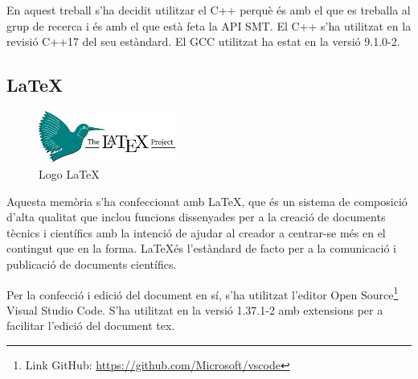 \documentclass[11pt,a4paper,twoside]{report}
\begin{document}
  En aquest treball s'ha decidit utilitzar el C++ perquè és amb el que es treballa al grup de recerca i és amb el que està feta la API SMT. El C++ s'ha utilitzat en la revisió C++17 del seu estàndard. El GCC utilitzat ha estat en la versió 9.1.0-2. 





  \subsection{\LaTeX}
  \begin{figure}[ht!]
    \centering
    \includegraphics[width=0.4\textwidth]{Diagrames/latex.png}
    \caption{Logo \LaTeX}
    \label{fig:latex}
  \end{figure}
  

  Aquesta memòria s'ha confeccionat amb \LaTeX, que és un sistema de composició d'alta qualitat que inclou funcions dissenyades per a la creació de documents tècnics i científics amb la intenció de ajudar al creador a centrar-se més en el contingut que en la forma.
\LaTeX és l'estàndard de facto per a la comunicació i publicació de documents científics. 

Per la confecció i edició del document en sí, s'ha utilitzat l'editor Open Source\footnote{Link GitHub: \url{https://github.com/Microsoft/vscode}} Visual Studio Code. S'ha utilitzat en la versió 1.37.1-2 amb extensions per a facilitar l'edició del document tex.
\end{document}
